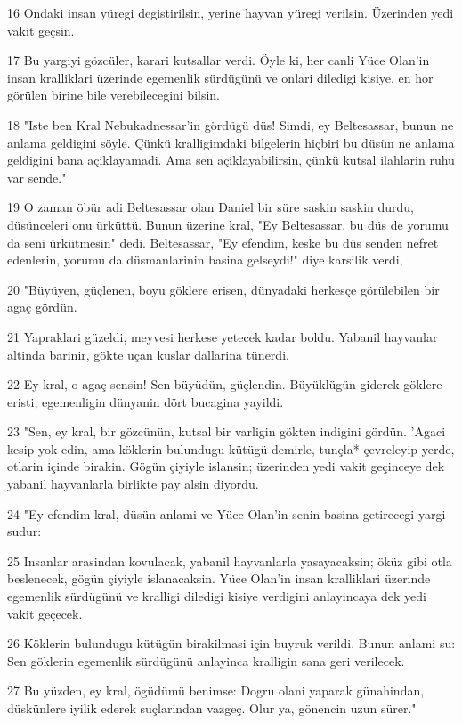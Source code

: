 \par 16 Ondaki insan yüregi degistirilsin, yerine hayvan yüregi verilsin. Üzerinden yedi vakit geçsin.
\par 17 Bu yargiyi gözcüler, karari kutsallar verdi. Öyle ki, her canli Yüce Olan'in insan kralliklari üzerinde egemenlik sürdügünü ve onlari diledigi kisiye, en hor görülen birine bile verebilecegini bilsin.
\par 18 "Iste ben Kral Nebukadnessar'in gördügü düs! Simdi, ey Beltesassar, bunun ne anlama geldigini söyle. Çünkü kralligimdaki bilgelerin hiçbiri bu düsün ne anlama geldigini bana açiklayamadi. Ama sen açiklayabilirsin, çünkü kutsal ilahlarin ruhu var sende."
\par 19 O zaman öbür adi Beltesassar olan Daniel bir süre saskin saskin durdu, düsünceleri onu ürküttü. Bunun üzerine kral, "Ey Beltesassar, bu düs de yorumu da seni ürkütmesin" dedi. Beltesassar, "Ey efendim, keske bu düs senden nefret edenlerin, yorumu da düsmanlarinin basina gelseydi!" diye karsilik verdi,
\par 20 "Büyüyen, güçlenen, boyu göklere erisen, dünyadaki herkesçe görülebilen bir agaç gördün.
\par 21 Yapraklari güzeldi, meyvesi herkese yetecek kadar boldu. Yabanil hayvanlar altinda barinir, gökte uçan kuslar dallarina tünerdi.
\par 22 Ey kral, o agaç sensin! Sen büyüdün, güçlendin. Büyüklügün giderek göklere eristi, egemenligin dünyanin dört bucagina yayildi.
\par 23 "Sen, ey kral, bir gözcünün, kutsal bir varligin gökten indigini gördün. 'Agaci kesip yok edin, ama köklerin bulundugu kütügü demirle, tunçla* çevreleyip yerde, otlarin içinde birakin. Gögün çiyiyle islansin; üzerinden yedi vakit geçinceye dek yabanil hayvanlarla birlikte pay alsin diyordu.
\par 24 "Ey efendim kral, düsün anlami ve Yüce Olan'in senin basina getirecegi yargi sudur:
\par 25 Insanlar arasindan kovulacak, yabanil hayvanlarla yasayacaksin; öküz gibi otla beslenecek, gögün çiyiyle islanacaksin. Yüce Olan'in insan kralliklari üzerinde egemenlik sürdügünü ve kralligi diledigi kisiye verdigini anlayincaya dek yedi vakit geçecek.
\par 26 Köklerin bulundugu kütügün birakilmasi için buyruk verildi. Bunun anlami su: Sen göklerin egemenlik sürdügünü anlayinca kralligin sana geri verilecek.
\par 27 Bu yüzden, ey kral, ögüdümü benimse: Dogru olani yaparak günahindan, düskünlere iyilik ederek suçlarindan vazgeç. Olur ya, gönencin uzun sürer."

